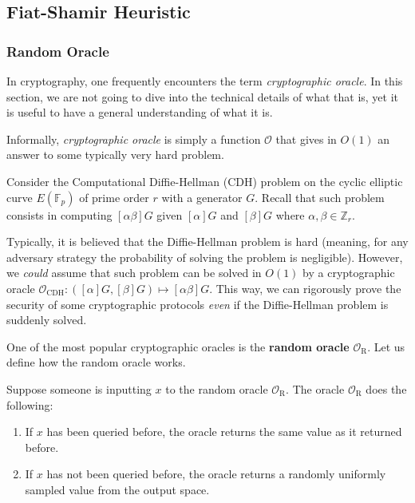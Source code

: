 \documentclass[../../book.tex]{subfiles}
\begin{document}
\subsection{Fiat-Shamir Heuristic}

\subsubsection{Random Oracle}

In cryptography, one frequently encounters the term \textit{cryptographic
oracle}. In this section, we are not going to dive into the technical details of
what that is, yet it is useful to have a general understanding of what it is.

\begin{definition}
    Informally, \textit{cryptographic oracle} is simply a function $\mathcal{O}$
    that gives in $O(1)$ an answer to some typically very hard problem.     
\end{definition}

\begin{example}
    Consider the Computational Diffie-Hellman (CDH) problem on the cyclic
    elliptic curve $E(\mathbb{F}_p)$ of prime order $r$ with a generator $G$.
    Recall that such problem consists in computing $[\alpha\beta]G$ given
    $[\alpha]G$ and $[\beta]G$ where $\alpha,\beta \in \mathbb{Z}_r$. 

    Typically, it is believed that the Diffie-Hellman problem is hard (meaning,
    for any adversary strategy the probability of solving the problem is
    negligible). However, we \textit{could} assume that such problem can be
    solved in $O(1)$ by a cryptographic oracle $\mathcal{O}_{\text{CDH}}:
    ([\alpha]G,[\beta]G) \mapsto [\alpha\beta]G$. This way, we can rigorously
    prove the security of some cryptographic protocols \textit{even} if the
    Diffie-Hellman problem is suddenly solved. 
\end{example}

One of the most popular cryptographic oracles is the \textbf{random oracle}
$\mathcal{O}_{\text{R}}$. Let us define how the random oracle works.

Suppose someone is inputting $x$ to the random oracle $\mathcal{O}_{\text{R}}$.
The oracle $\mathcal{O}_{\text{R}}$ does the following:
\begin{enumerate}
    \item If $x$ has been queried before, the oracle returns the same value as
    it returned before.
    \item If $x$ has not been queried before, the oracle returns a randomly
    uniformly sampled value from the output space.
\end{enumerate}
\end{document}
